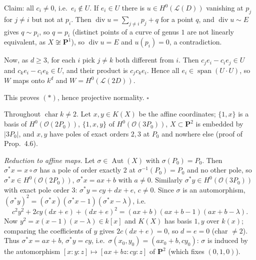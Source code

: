\documentclass[11pt]{article}
\begin{document}
Claim: all $c_i\ne0$, i.e.\ $e_i\notin U$. If $e_i\in U$ there is $u\in H^0(\mathcal L(D))$ vanishing at $p_j$ for $j\ne i$ but not at $p_i$. Then $\operatorname{div}u=\sum_{j\ne i}p_j+q$ for a point $q$, and $\operatorname{div}u\sim E$ gives $q\sim p_i$, so $q=p_i$ (distinct points of a curve of genus $1$ are not linearly equivalent, as $X\not\cong\mathbf P^1$), so $\operatorname{div}u=E$ and $u(p_i)=0$, a contradiction.

Now, as $d\ge3$, for each $i$ pick $j\ne k$ both different from $i$. Then $c_je_i-c_ie_j\in U$ and $c_ke_i-c_ie_k\in U$, and their product is $c_jc_ke_i$. Hence all $e_i\in\operatorname{span}(U\cdot U)$, so $W$ maps onto $k^d$ and $W=H^0(\mathcal L(2D))$.

This proves $(\ast)$, hence projective normality. \hfill$\square$

\pf
Throughout $\operatorname{char}k\ne2$. Let $x,y\in K(X)$ be the affine coordinates; $\{1,x\}$ is a basis of $H^0(\mathcal O(2P_0))$, $\{1,x,y\}$ of $H^0(\mathcal O(3P_0))$, $X\subset\mathbf P^2$ is embedded by $|3P_0|$, and $x,y$ have poles of exact orders $2,3$ at $P_0$ and nowhere else (proof of Prop.~4.6).

\emph{Reduction to affine maps.} Let $\sigma\in\operatorname{Aut}(X)$ with $\sigma(P_0)=P_0$. Then $\sigma^*x=x\circ\sigma$ has a pole of order exactly $2$ at $\sigma^{-1}(P_0)=P_0$ and no other pole, so $\sigma^*x\in H^0(\mathcal O(2P_0))$, $\sigma^*x=ax+b$ with $a\ne0$. Similarly $\sigma^*y\in H^0(\mathcal O(3P_0))$ with exact pole order $3$: $\sigma^*y=cy+dx+e$, $c\ne0$. Since $\sigma$ is an automorphism, $(\sigma^*y)^2=(\sigma^*x)(\sigma^*x-1)(\sigma^*x-\lambda)$, i.e.
\[ c^2y^2+2cy(dx+e)+(dx+e)^2=(ax+b)(ax+b-1)(ax+b-\lambda). \]
Now $y^2=x(x-1)(x-\lambda)\in k[x]$ and $K(X)$ has basis $1,y$ over $k(x)$; comparing the coefficients of $y$ gives $2c(dx+e)=0$, so $d=e=0$ (char $\ne2$). Thus $\sigma^*x=ax+b$, $\sigma^*y=cy$, i.e.\ $\sigma(x_0,y_0)=(ax_0+b,cy_0)$: $\sigma$ is induced by the automorphism $[x:y:z]\mapsto[ax+bz:cy:z]$ of $\mathbf P^2$ (which fixes $(0,1,0)$).
\end{document}
